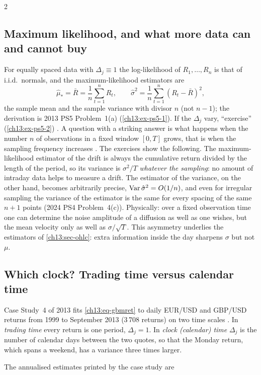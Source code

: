 \begin{paracol}{2}
\subsection{Maximum likelihood, and what more data can and cannot buy}
For equally spaced data with $\Delta_j\equiv1$ the log-likelihood of $R_1,\dots,R_n$ is that of i.i.d.\ normals, and the
maximum-likelihood estimators are 
\begin{equation}\label{ch13:eq-gbmmle}
  \hat\mu_*=\bar R=\frac1n\sum_{t=1}^nR_t,\qquad \hat\sigma^2=\frac1n\sum_{t=1}^n(R_t-\bar R)^2,
\end{equation}
the sample mean and the sample variance with divisor $n$ (not $n-1$); the derivation is 2013 PS5 Problem~1(a)
(\cref{ch13:ex-ps5-1}). If the $\Delta_j$ vary, ``exercise'' (\cref{ch13:ex-ps5-2}) . A question with a striking
answer is what happens when the number $n$ of observations in a fixed window $[0,T]$ grows, that is when the
sampling frequency increases . The exercises show the following. The maximum-likelihood
estimator of the drift is always the cumulative return divided by the length of the period, so its variance is
$\sigma^2/T$ \emph{whatever the sampling}: no amount of intraday data helps to measure a drift. The estimator of the
variance, on the other hand, becomes arbitrarily precise, $\operatorname{Var}\hat\sigma^2=O(1/n)$, and even for irregular sampling the
variance of the estimator is the same for every spacing of the same $n+1$ points (2024 PS4 Problem~4(c)).
Physically: over a fixed observation time one can determine the noise amplitude of a diffusion as well as one wishes, but the
mean velocity only as well as $\sigma/\sqrt T$. This asymmetry underlies the estimators of \cref{ch13:sec-ohlc}: extra
information inside the day sharpens $\sigma$ but not $\mu$.

\subsection{Which clock? Trading time versus calendar time}\label{ch13:sec-clock}
Case Study~4 of 2013 fits \eqref{ch13:eq-gbmret} to daily EUR/USD and GBP/USD returns from 1999 to September 2013 (3\,708 returns) on two time
scales . In \emph{trading time} every return is one period, $\Delta_j=1$. In \emph{clock (calendar) time}
$\Delta_j$ is the number of calendar days between the two quotes, so that the Monday return, which spans a weekend, has a variance
three times larger.
\begin{secondary}
The annualised estimates printed by the case study are


\end{secondary}
\end{paracol}
